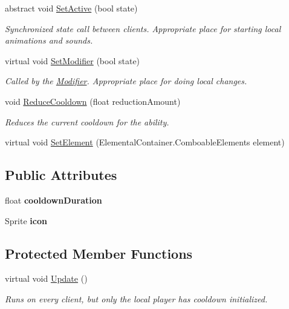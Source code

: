 \begin{DoxyCompactItemize}
abstract void \hyperlink{class_ability_a10f7f3c2b63eeef6e352aee48d246384}{Set\+Active} (bool state)
\begin{DoxyCompactList}\small\item\em Synchronized state call between clients. Appropriate place for starting local animations and sounds. \end{DoxyCompactList}\item 
virtual void \hyperlink{class_ability_a18f5361c45dc334b541892880382c098}{Set\+Modifier} (bool state)
\begin{DoxyCompactList}\small\item\em Called by the \hyperlink{class_modifier}{Modifier}. Appropriate place for doing local changes. \end{DoxyCompactList}\item 
void \hyperlink{class_ability_ad16a83f1ae0811435b1ab91cf954ece9}{Reduce\+Cooldown} (float reduction\+Amount)
\begin{DoxyCompactList}\small\item\em Reduces the current cooldown for the ability. \end{DoxyCompactList}\item 
virtual void \hyperlink{class_ability_ad01c565b443fdca24556f1d7c054da3f}{Set\+Element} (Elemental\+Container.\+Comboable\+Elements element)
\end{DoxyCompactItemize}
\subsection*{Public Attributes}
\begin{DoxyCompactItemize}
\item 
\hypertarget{class_ability_a0988ba1c0a8584cb6fda07d0e41f6b2c}{}\label{class_ability_a0988ba1c0a8584cb6fda07d0e41f6b2c} 
float {\bfseries cooldown\+Duration}
\item 
\hypertarget{class_ability_a3511b54a419a0a55945f81a4f79fe15c}{}\label{class_ability_a3511b54a419a0a55945f81a4f79fe15c} 
Sprite {\bfseries icon}
\end{DoxyCompactItemize}
\subsection*{Protected Member Functions}
\begin{DoxyCompactItemize}
\item 
virtual void \hyperlink{class_ability_a88d799f38be464be5f0a9a315efb2d0b}{Update} ()
\begin{DoxyCompactList}\small\item\em Runs on every client, but only the local player has cooldown initialized. \end{DoxyCompactList}\end{DoxyCompactItemize}
